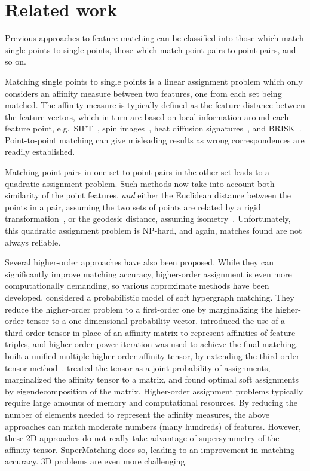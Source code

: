 \section{Related work}
\label{sec:related}

Previous approaches to feature matching can be classified into those which match single points to single points, those which match  point pairs to point pairs, and so on.

Matching single points to single points is a linear assignment problem which only considers an affinity measure between two features, one from each set being matched.
The affinity measure is typically defined as the feature distance between the feature vectors, which in turn are based on local information around each feature point,
e.g.\ SIFT~\cite{Lowe04}, spin images~\cite{Johnson99}, heat diffusion signatures~\cite{Sun09}, and BRISK~\cite{Leutenegger11}.
Point-to-point matching can give misleading results as wrong correspondences are readily established.

Matching point pairs  in one set to point pairs in the other set leads to a quadratic assignment problem.
Such methods now  take into account both similarity of the point features, \emph{and} either the Euclidean distance between the points in a pair,
assuming the two sets of points are related by a rigid transformation~\cite{Leordeanu05,Cour06}, or the geodesic distance, assuming isometry~\cite{li08,Tevs09,Ovsjanikov10,Tevs11,SahilliogluY11,Windheuser11}.
Unfortunately, this quadratic assignment problem is NP-hard, and again, matches found are not always reliable.

Several higher-order approaches have also been proposed.
While they can significantly improve matching accuracy,
higher-order assignment  is even more computationally demanding, so various approximate methods have been developed.
\cite{Zass08} considered a probabilistic model of soft hypergraph matching.
They reduce the higher-order problem to a first-order one by marginalizing the higher-order tensor to a one dimensional probability vector.
\cite{Duchenne09,Duchenne2011} introduced the use of a third-order tensor in place of an affinity matrix to represent affinities of feature triples,
and higher-order power iteration was used to achieve the final matching.
\cite{Aiping10} built a unified multiple higher-order affinity tensor, by extending the third-order tensor method~\cite{Duchenne09,Duchenne2011}.
\cite{Chertok10} treated the tensor as a joint probability of assignments, marginalized the affinity tensor to a matrix,
and found optimal soft assignments by eigendecomposition of the matrix.
Higher-order assignment problems typically require large amounts of memory and computational resources. By reducing the number of elements needed to represent the affinity measures, the above approaches can match moderate numbers (many hundreds) of features. However, these 2D approaches do not really take advantage of supersymmetry of the affinity tensor. SuperMatching does so, leading to an improvement in matching accuracy.
3D problems are even more challenging.

